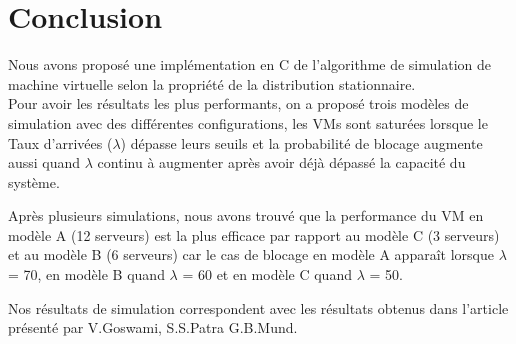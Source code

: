 \section{Conclusion}
\noindent Nous avons proposé une implémentation en C de l’algorithme de simulation de machine virtuelle selon la propriété de la distribution stationnaire. 
\\
\noindent Pour avoir les résultats les plus performants, on a proposé trois modèles de simulation avec des différentes configurations, les VMs sont saturées lorsque le Taux d'arrivées ($\lambda$) dépasse leurs seuils et la probabilité de blocage augmente aussi quand $\lambda$ continu à augmenter après avoir déjà dépassé la capacité du système.

\noindent Après plusieurs simulations, nous avons trouvé que la performance du VM en modèle A (12 serveurs) est la plus efficace par rapport au modèle C (3 serveurs) et au modèle B (6 serveurs) car le cas de blocage en modèle A apparaît lorsque $\lambda$ = 70, en modèle B quand  $\lambda$ = 60 et en modèle C quand $\lambda$ = 50.

\noindent Nos résultats de simulation correspondent avec les résultats obtenus dans l'article présenté par V.Goswami, S.S.Patra G.B.Mund.
